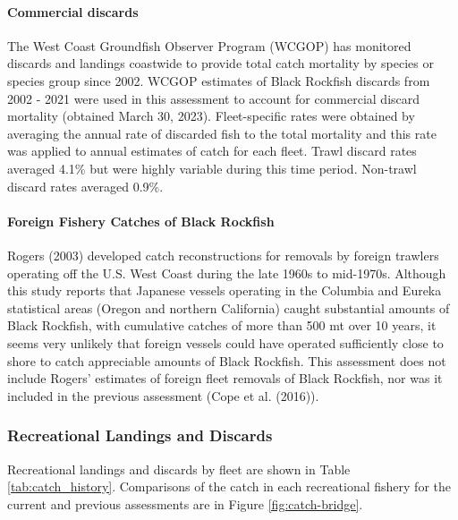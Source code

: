 \documentclass[11pt,
  letterpaper,
]{article}
\begin{document}
\hypertarget{commercial-discards}{%
\paragraph{Commercial discards}\label{commercial-discards}}

The West Coast Groundfish Observer Program (WCGOP) has monitored discards and landings coastwide to provide total catch mortality by species or species group since 2002. WCGOP estimates of Black Rockfish discards from 2002 - 2021 were used in this assessment to account for commercial discard mortality (obtained March 30, 2023). Fleet-specific rates were obtained by averaging the annual rate of discarded fish to the total mortality and this rate was applied to annual estimates of catch for each fleet. Trawl discard rates averaged 4.1\% but were highly variable during this time period. Non-trawl discard rates averaged 0.9\%.

\hypertarget{foreign-fishery-catches-of-black-rockfish}{%
\paragraph{Foreign Fishery Catches of Black Rockfish}\label{foreign-fishery-catches-of-black-rockfish}}

Rogers (2003) developed catch reconstructions for removals by foreign trawlers operating off the U.S. West Coast during the late 1960s to mid-1970s. Although this study reports that Japanese vessels operating in the Columbia and Eureka statistical areas (Oregon and northern California) caught substantial amounts of Black Rockfish, with cumulative catches of more than 500 mt over 10 years, it seems very unlikely that foreign vessels could have operated sufficiently close to shore to catch appreciable amounts of Black Rockfish. This assessment does not include Rogers' estimates of foreign fleet removals of Black Rockfish, nor was it included in the previous assessment (Cope et al. (2016)).

\hypertarget{recreational-landings-and-discards}{%
\subsubsection{Recreational Landings and Discards}\label{recreational-landings-and-discards}}

Recreational landings and discards by fleet are shown in Table \ref{tab:catch_history}. Comparisons of the catch in each recreational fishery for the current and previous assessments are in Figure \ref{fig:catch-bridge}.
\end{document}
